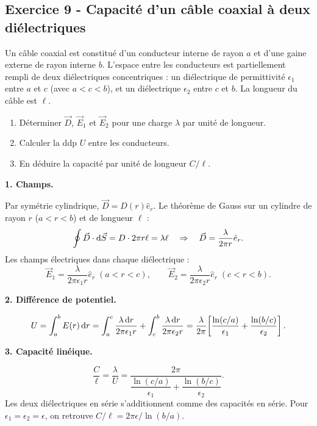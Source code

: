 \documentclass[12pt,a4paper]{article}
\begin{document}
\subsection*{Exercice 9 - Capacité d'un câble coaxial à deux diélectriques \niveau{\moyen}}

\begin{boiteexercice}
Un câble coaxial est constitué d'un conducteur interne de rayon $a$ et d'une gaine externe de rayon interne $b$. L'espace entre les conducteurs est partiellement rempli de deux diélectriques concentriques : un diélectrique de permittivité $\epsilon_1$ entre $a$ et $c$ (avec $a<c<b$), et un diélectrique $\epsilon_2$ entre $c$ et $b$. La longueur du câble est $\ell$.
\begin{enumerate}
  \item Déterminer $\vec{D}$, $\vec{E}_1$ et $\vec{E}_2$ pour une charge $\lambda$ par unité de longueur.
  \item Calculer la ddp $U$ entre les conducteurs.
  \item En déduire la capacité par unité de longueur $C/\ell$.
\end{enumerate}
\end{boiteexercice}

\begin{boitecorrige}

\textbf{1. Champs.}

Par symétrie cylindrique, $\vec{D} = D(r)\hat{e}_r$. Le théorème de Gauss sur un cylindre de rayon $r$ ($a<r<b$) et de longueur $\ell$ :
\[
\oint \vec{D}\cdot\mathrm{d}\vec{S} = D\cdot 2\pi r \ell = \lambda \ell \quad\Rightarrow\quad \vec{D} = \frac{\lambda}{2\pi r}\hat{e}_r.
\]
Les champs électriques dans chaque diélectrique :
\[
\vec{E}_1 = \frac{\lambda}{2\pi\epsilon_1 r}\hat{e}_r \;(a<r<c), \qquad \vec{E}_2 = \frac{\lambda}{2\pi\epsilon_2 r}\hat{e}_r \;(c<r<b).
\]

\textbf{2. Différence de potentiel.}

\[
U = \int_a^b E(r)\,\mathrm{d} r = \int_a^c \frac{\lambda\,\mathrm{d} r}{2\pi\epsilon_1 r} + \int_c^b \frac{\lambda\,\mathrm{d} r}{2\pi\epsilon_2 r} = \frac{\lambda}{2\pi}\!\left[\frac{\ln(c/a)}{\epsilon_1} + \frac{\ln(b/c)}{\epsilon_2}\right].
\]

\textbf{3. Capacité linéique.}

\[
\frac{C}{\ell} = \frac{\lambda}{U} = \frac{2\pi}{\dfrac{\ln(c/a)}{\epsilon_1} + \dfrac{\ln(b/c)}{\epsilon_2}}.
\]
Les deux diélectriques en série s'additionnent comme des capacités en série. Pour $\epsilon_1 = \epsilon_2 = \epsilon$, on retrouve $C/\ell = 2\pi\epsilon/\ln(b/a)$.

\end{boitecorrige}
\end{document}
